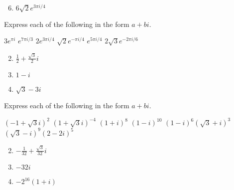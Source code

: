 \begin{multicols}{2}
\begin{ex}
\begin{sol}
\begin{enumerate}[label={\alph*.}]
\setcounter{enumi}{5}
\item  $6\sqrt{2}e^{3\pi i/4}$


\end{enumerate}
\end{sol}
\end{ex}

\columnbreak

\begin{ex}
Express each of the following in the form $a + bi$.

\begin{exenumerate}
\exitem $3e^{\pi i}$
\exitem $e^{7\pi i/3}$
\exitem $2e^{3 \pi i/4}$
\exitem $\sqrt{2}e^{-\pi i/4}$
\exitem $e^{5\pi i/4}$
\exitem $2\sqrt{3}e^{-2\pi i/6}$
\end{exenumerate}
\begin{sol}
\begin{enumerate}[label={\alph*.}]
\setcounter{enumi}{1}
\item  $\frac{1}{2} + \frac{\sqrt{3}}{2} i$

\setcounter{enumi}{3}
\item  $1 - i$

\setcounter{enumi}{5}
\item $\sqrt{3} - 3i$


\end{enumerate}
\end{sol}
\end{ex}

\begin{ex}
Express each of the following in the form $a + bi$.

\begin{exenumerate}
\exitem $(-1 + \sqrt{3}i)^2$
\exitem $(1 + \sqrt{3}i)^{-4}$
\exitem $(1 + i)^8$
\exitem $(1 - i)^{10}$
\exitem $(1 - i)^{6}(\sqrt{3} + i)^{3}$
\exitem $(\sqrt{3} - i)^{9}(2 - 2i)^{5}$
\end{exenumerate}
\begin{sol}
\begin{enumerate}[label={\alph*.}]
\setcounter{enumi}{1}
\item  $-\frac{1}{32} + \frac{\sqrt{3}}{32}i$


\setcounter{enumi}{3}
\item  $-32i$

\setcounter{enumi}{5}
\item  $-2^{16}(1 + i)$

\end{enumerate}
\end{sol}
\end{ex}


\end{multicols}
